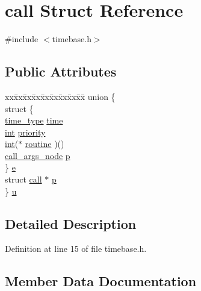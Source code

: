 \hypertarget{structcall}{}\section{call Struct Reference}
\label{structcall}


{\ttfamily \#include $<$timebase.\+h$>$}

\subsection*{Public Attributes}
\begin{DoxyCompactItemize}
\item 
\begin{tabbing}
xx\=xx\=xx\=xx\=xx\=xx\=xx\=xx\=xx\=\kill
union \{\\
\>struct \{\\
\>\>\hyperlink{midifns_8h_a3f787491db5dbc75c21b27d54e9ebae6}{time\_type} \hyperlink{structcall_a9283034caf24f8be4e668851ae802ef9}{time}\\
\>\>\hyperlink{xmltok_8h_a5a0d4a5641ce434f1d23533f2b2e6653}{int} \hyperlink{structcall_a3193459339ea2cd7def783bf558ec218}{priority}\\
\>\>\hyperlink{xmltok_8h_a5a0d4a5641ce434f1d23533f2b2e6653}{int}($\ast$ \hyperlink{structcall_a73409c26b38fb482fae6d3e4c6eee83f}{routine} )()\\
\>\>\hyperlink{timebase_8h_a69fd223628aabdd8bf73febbcf0f1c1d}{call\_args\_node} \hyperlink{structcall_a28e8fe3a54f9fb88e4a27f20458f1cbe}{p}\\
\>\} \hyperlink{structcall_a50f800b41e602b0ba7ff1052e4ad6a92}{e}\\
\>struct \hyperlink{structcall}{call} $\ast$ \hyperlink{structcall_aee32cf5949691e418649c7b5758ac920}{p}\\
\} \hyperlink{structcall_a0f49d493b3e8902b0879fe1c280b408a}{u}\\

\end{tabbing}\end{DoxyCompactItemize}


\subsection{Detailed Description}


Definition at line 15 of file timebase.\+h.



\subsection{Member Data Documentation}

